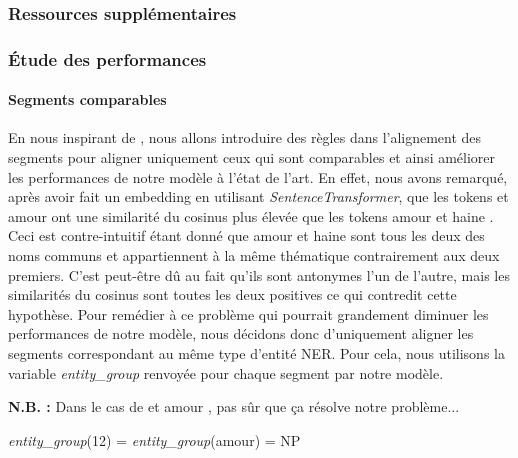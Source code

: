 \documentclass[a4paper, twoside, 11pt]{article}
\begin{document}
 \subsubsection{Ressources supplémentaires}
 \subsubsection{Étude des performances}
 \paragraph{Segments comparables}
        \hfill \break
En nous inspirant de \cite{banjade}, nous allons introduire des règles dans l’alignement des segments pour aligner uniquement ceux qui sont \og comparables \fg{} et ainsi améliorer les performances de notre modèle à l'état de l'art. En effet, nous avons remarqué, après avoir fait un \og embedding \fg{} en utilisant \textit{SentenceTransformer}, que les tokens  \fg{} et \og amour \fg{} ont une similarité du cosinus plus élevée que les tokens \og amour \fg{} et  \og haine \fg{}. Ceci est contre-intuitif étant donné que \og amour \fg{} et \og haine \fg{} sont tous les deux des noms communs et appartiennent à la même thématique contrairement aux deux premiers. C'est peut-être dû au fait qu'ils sont antonymes l’un de l’autre, mais les similarités du cosinus sont toutes les deux positives ce qui contredit cette hypothèse.
Pour remédier à ce problème qui pourrait grandement diminuer les performances de notre modèle, nous décidons donc d’uniquement aligner les segments correspondant au même type d’entité NER. Pour cela, nous utilisons la variable \textit{entity\_group} renvoyée pour chaque segment par notre modèle.

\textbf{N.B. :} Dans le cas de  \fg{} et \og amour \fg{}, pas sûr que ça résolve notre problème...

 \textit{entity\_group}(12) = \textit{entity\_group}(amour) = NP

    \printbibliography
\end{document}
